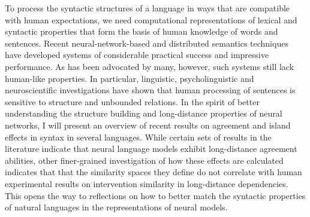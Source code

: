To process the syntactic structures of a language in ways that are compatible with human expectations, we need computational representations of lexical and syntactic properties that form the basis of human knowledge of words and sentences. Recent neural-network-based and distributed semantics techniques have developed systems of considerable practical success and impressive performance. As has been advocated by many, however, such systems still lack human-like properties. In particular, linguistic, psycholinguistic and neuroscientific investigations have shown that human processing of sentences is sensitive to structure and unbounded relations. In the spirit of better understanding the structure building and long-distance properties of neural networks, I will present an overview of recent results on agreement and island effects in syntax in several languages. While certain sets of results in the literature indicate that neural language models exhibit long-distance agreement abilities, other finer-grained investigation of how these effects are calculated indicates that that the similarity spaces they define do not correlate with human experimental results on intervention similarity in long-distance dependencies. This opens the way to reflections on how to better match the syntactic properties of natural languages in the representations of neural models.
